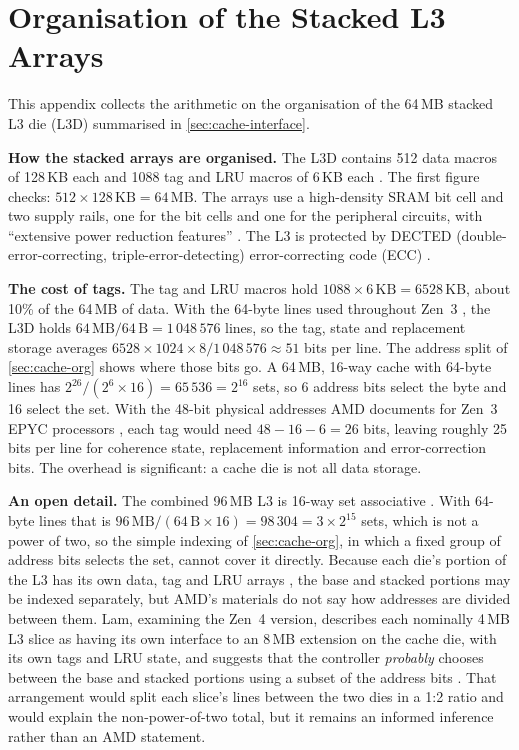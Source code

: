 \clearpage
\section{Organisation of the Stacked L3 Arrays}
\label{app:l3d-organisation}

This appendix collects the arithmetic on the organisation of the 64\,MB stacked L3 die (L3D) summarised in \cref{sec:cache-interface}.

\textbf{How the stacked arrays are organised.} The L3D contains 512 data macros of 128\,KB each and 1088 tag and LRU macros of 6\,KB each \cite[slide~25]{wuu2022vcache}. The first figure checks: $512 \times 128\,\text{KB} = 64\,\text{MB}$. The arrays use a high-density SRAM bit cell and two supply rails, one for the bit cells and one for the peripheral circuits, with ``extensive power reduction features'' \cite[slide~25]{wuu2022vcache}. The L3 is protected by DECTED (double-error-correcting, triple-error-detecting) error-correcting code (ECC) \cite[slide~19]{wuu2022vcache}.

\textbf{The cost of tags.} The tag and LRU macros hold $1088 \times 6\,\text{KB} = 6528$\,KB, about 10\% of the 64\,MB of data. With the 64-byte lines used throughout Zen~3 \cite{amd2022epyc7003}, the L3D holds $64\,\text{MB}/64\,\text{B} = 1\,048\,576$ lines, so the tag, state and replacement storage averages $6528 \times 1024 \times 8 / 1\,048\,576 \approx 51$ bits per line. The address split of \cref{sec:cache-org} shows where those bits go. A 64\,MB, 16-way cache with 64-byte lines has $2^{26}/(2^{6} \times 16) = 65\,536 = 2^{16}$ sets, so 6 address bits select the byte and 16 select the set. With the 48-bit physical addresses AMD documents for Zen~3 EPYC processors \cite[p.~10]{advancedmicrodevicesinc.UsingSEVAMD2023}, each tag would need $48 - 16 - 6 = 26$ bits, leaving roughly 25 bits per line for coherence state, replacement information and error-correction bits. The overhead is significant: a cache die is not all data storage.

\textbf{An open detail.} The combined 96\,MB L3 is 16-way set associative \cite[slide~20]{wuu2022vcache}. With 64-byte lines that is $96\,\text{MB} / (64\,\text{B} \times 16) = 98\,304 = 3 \times 2^{15}$ sets, which is not a power of two, so the simple indexing of \cref{sec:cache-org}, in which a fixed group of address bits selects the set, cannot cover it directly. Because each die's portion of the L3 has its own data, tag and LRU arrays \cite[slide~20]{wuu2022vcache}, the base and stacked portions may be indexed separately, but AMD's materials do not say how addresses are divided between them. Lam, examining the Zen~4 version, describes each nominally 4\,MB L3 slice as having its own interface to an 8\,MB extension on the cache die, with its own tags and LRU state, and suggests that the controller \emph{probably} chooses between the base and stacked portions using a subset of the address bits \cite{lamAMDs7950X3DZen2023}. That arrangement would split each slice's lines between the two dies in a 1:2 ratio and would explain the non-power-of-two total, but it remains an informed inference rather than an AMD statement.
